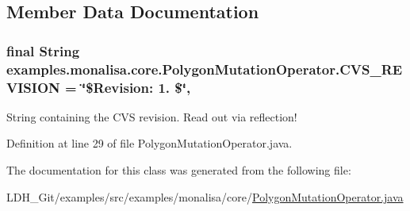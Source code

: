 \subsection{Member Data Documentation}
\hypertarget{classexamples_1_1monalisa_1_1core_1_1_polygon_mutation_operator_a3cec1ce37f5d974729392698531690b0}{
\subsubsection[{C\-V\-S\-\_\-\-R\-E\-V\-I\-S\-I\-O\-N}]{\setlength{\rightskip}{0pt plus 5cm}final String examples.\-monalisa.\-core.\-Polygon\-Mutation\-Operator.\-C\-V\-S\-\_\-\-R\-E\-V\-I\-S\-I\-O\-N = \char`\"{}\$Revision\-: 1. \$\char`\"{}\hspace{0.3cm}{\ttfamily [static]}, {\ttfamily [private]}}}\label{classexamples_1_1monalisa_1_1core_1_1_polygon_mutation_operator_a3cec1ce37f5d974729392698531690b0}
String containing the C\-V\-S revision. Read out via reflection! 

Definition at line 29 of file Polygon\-Mutation\-Operator.\-java.



The documentation for this class was generated from the following file\-:\begin{DoxyCompactItemize}
\item 
L\-D\-H\-\_\-\-Git/examples/src/examples/monalisa/core/\hyperlink{_polygon_mutation_operator_8java}{Polygon\-Mutation\-Operator.\-java}\end{DoxyCompactItemize}

